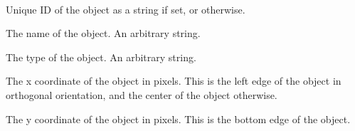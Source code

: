 \documentclass[letterpaper,10pt,english]{sphinxmanual}
\begin{document}
\begin{fulllineitems}
\label{index:tmx.Object}~

\begin{fulllineitems}
\label{index:tmx.Object.id}
Unique ID of the object as a string if set, or 
otherwise.

\end{fulllineitems}


\begin{fulllineitems}
\label{index:tmx.Object.name}
The name of the object.  An arbitrary string.

\end{fulllineitems}


\begin{fulllineitems}
\label{index:tmx.Object.type}
The type of the object.  An arbitrary string.

\end{fulllineitems}


\begin{fulllineitems}
\label{index:tmx.Object.x}
The x coordinate of the object in pixels.  This is the
left edge of the object in orthogonal orientation, and the center
of the object otherwise.

\end{fulllineitems}


\begin{fulllineitems}
\label{index:tmx.Object.y}
The y coordinate of the object in pixels.  This is the bottom
edge of the object.

\end{fulllineitems}



\end{fulllineitems}
\end{document}
